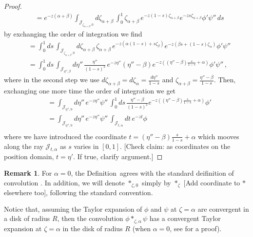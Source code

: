 \documentclass{article}
\theoremstyle{definition}
\newtheorem{remark}[definition]{Remark}
\theoremstyle{plain}
\newenvironment{todo}{\color{Coral}}{\color{black}}
\newenvironment{draft}{\color{SlateBlue}}{\color{black}}
\begin{document}
\begin{proof}
\begin{align*}
       &=e^{-z(\alpha+\beta)}\int_{\mathcal{J}_{\zeta_{\alpha+\beta},0}}d\zeta_{\alpha+\beta}\, \int_0^1 \zeta_{\alpha+\beta}\,e^{-z(1-s)\zeta_{\alpha+\beta}} e^{-z s\zeta_{\alpha+\beta}} \phi' \psi''\,ds 
   \end{align*}
   by exchanging the order of integration we find 
   \begin{align*}
        &=\int_0^1 ds\,\int_{\mathcal{J}_{\zeta_{\alpha+\beta},0}}d\zeta_{\alpha+\beta}\,\zeta_{\alpha+\beta}\,e^{-z(\alpha(1-s)+s\zeta_\beta)} e^{-z(\beta s+(1-s)\zeta_\alpha)} \phi' \psi'' \\
        &=\int_0^1 ds\,\int_{\mathcal{J}_{\eta'',\beta}}d\eta''\,\frac{\eta''}{(1-s)^2}\,e^{-z\eta''} (\eta''-\beta) e^{-z( (\eta''-\beta) \frac{s}{1-s}+\alpha)} \phi' \psi''\,,
   \end{align*}
   where in the second step we use $d\zeta_{\alpha+\beta}=d\zeta_\alpha=\frac{d\eta''}{1-s}$ and $\zeta_{\alpha+\beta}=\frac{\eta''-\beta}{1-s}$. Then, exchanging one more time the order of integration we get
    \begin{align*}
        &=\int_{\mathcal{J}_{\eta'',0}}d\eta'' \,e^{-z\eta''}  \psi'' \,\int_0^1 ds\,\frac{\eta''-\beta}{(1-s)^2}e^{-z((\eta''-\beta) \frac{s}{1-s}+\alpha)} \phi'\\
        &=\int_{\mathcal{J}_{\eta'',0}}d\eta'' \,e^{-z\eta''}  \psi'' \,\int_{\mathcal{J}_{t,\alpha}} dt\, e^{-zt} \phi\\
   \end{align*}
   where we have introduced the coordinate $t=(\eta''-\beta)\frac{s}{1-s}+\alpha$ which mooves along the ray $\mathcal{J}_{t,\alpha}$ as $s$ varies in $[0,1]$. \begin{todo}[Check claim: as coordinates on the position domain, $t = \eta'$. If true, clarify argument.]\end{todo}
\end{proof}
%
\begin{remark}
For $\alpha=0$, the Definition~\label{def:convolution} agrees with the standard deifinition of convolution \cite[Definition~5.12]{diverg-resurg-i}.
In addition, we will denote $\ast_{\zeta,0}$ simply by \begin{draft}$\ast_\zeta$\end{draft} \begin{todo}[Add coordinate to $\ast$ elsewhere too]\end{todo}, following the standard convention.   
\end{remark}
Notice that, assuming the Taylor expansion of $\phi$ and $\psi$ at $\zeta=\alpha$ are convergent in a disk of radius $R$, then the convolution $\phi\ast_{\zeta,\alpha}\psi$ has a convergent Taylor expansion at $\zeta=\alpha$ in the disk of radius $R$ (when $\alpha=0$, see \cite[Lemma 5.14]{diverg-resurg-i} for a proof).
\end{document}
